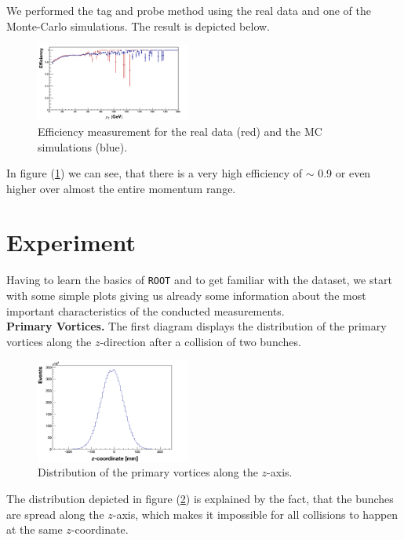 \documentclass[twocolumn,
			   showpacs,%
               nofootinbib,
               aps,%
               prd,
               notitlepage,
               showkeys,
               10pt]{revtex4-1}
\begin{document}
 We performed the tag and probe method using the real data and one of the Monte-Carlo simulations. The result is depicted below.

\begin{figure}[H]
\centering
\includegraphics[width=0.45\textwidth]{figures/plots/Efficiency_corr}
\caption{Efficiency measurement for the real data (red) and the MC simulations (blue).}
\label{fig:eff}
\end{figure}
In figure (\ref{fig:eff}) we can see, that there is a very high efficiency of $\sim$ 0.9 or even higher over almost the entire momentum range.

\section{Experiment}

Having to learn the basics of \verb|ROOT| and to get familiar with the dataset, we start with some simple plots giving us already some information about the most important characteristics of the conducted measurements.\\

\textbf{Primary Vortices.} The first diagram displays the distribution of the primary vortices along the $z$-direction after a collision of two bunches.
\begin{figure}[H]
\centering
\includegraphics[width = 0.45\textwidth]{figures/plots/DistPrimVort_corr}
\caption{Distribution of the primary vortices along the $z$-axis.}
\label{fig:vortices}
\end{figure}
The distribution depicted in figure (\ref{fig:vortices}) is explained by the fact, that the bunches are spread along the $z$-axis, which makes it impossible for all collisions to happen at the same $z$-coordinate.\\
\end{document}
